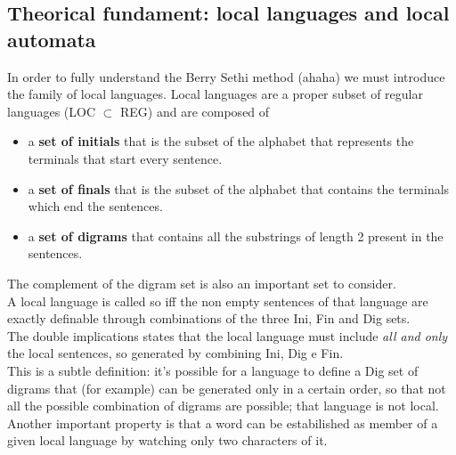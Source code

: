 		\subsection{Theorical fundament: local languages and local automata}
			In order to fully understand the Berry Sethi method (ahaha) we must introduce the family of local languages. Local languages are a proper subset of regular languages (LOC $\subset$ REG) and are composed of
			\begin{itemize}
				\item a \textbf{set of initials} that is the subset of the alphabet that represents the terminals that start every sentence.
				\item a \textbf{set of finals} that is the subset of the alphabet that contains the terminals which end the sentences.
				\item a \textbf{set of digrams} that contains all the substrings of length 2 present in the sentences.
			\end{itemize}
			The complement of the digram set is also an important set to consider.\\
			A local language is called so iff the non empty sentences of that language are exactly definable through combinations of the three Ini, Fin and Dig sets.\\
			The double implications states that the local language must include \emph{all and only} the local sentences, so generated by combining Ini, Dig e Fin.\\
			This is a subtle definition: it's possible for a language to define a Dig set of digrams that (for example) can be generated only in a certain order, so that not all the possible combination of digrams are possible; that language is not local.\\
			Another important property is that a word can be estabilished as member of a given local language by watching only two characters of it. 
